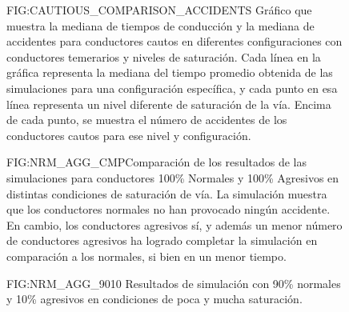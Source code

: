 \begin{figure}[Mediana de tiempos y accidentes de conductores Cautos]{FIG:CAUTIOUS_COMPARISON_ACCIDENTS}{
    Gráfico que muestra la mediana de tiempos de conducción y la mediana de accidentes para conductores cautos en diferentes configuraciones con conductores temerarios
    y niveles de saturación. Cada línea en la gráfica representa la mediana del tiempo promedio obtenida de las simulaciones para
    una configuración específica, y cada punto en esa línea representa un nivel diferente de saturación de la vía.
    Encima de cada punto, se muestra el número de accidentes de los conductores cautos para ese nivel y configuración.
}
\end{figure}

\begin{figure}[Resultados para conductores Normales y Agresivos, separados]{FIG:NRM_AGG_CMP}{Comparación de los resultados de las simulaciones para conductores 100\% Normales y 100\% Agresivos en distintas condiciones de saturación de vía. La simulación muestra que los conductores normales no han provocado ningún accidente. En cambio, los conductores agresivos sí, y además un menor número de conductores agresivos ha logrado completar la simulación en comparación a los normales, si bien en un menor tiempo.}
     \hspace{1cm}
     \vspace{1cm}
    
     \hspace{1cm}
\end{figure}

\begin{figure}[Resultados para conductores Normales y Agresivos, conviviendo 1]{FIG:NRM_AGG_9010}{
    Resultados de simulación con 90\% normales y 10\% agresivos en condiciones de poca y mucha saturación.}
     \hspace{1cm}
     \vspace{1cm}
\end{figure}

